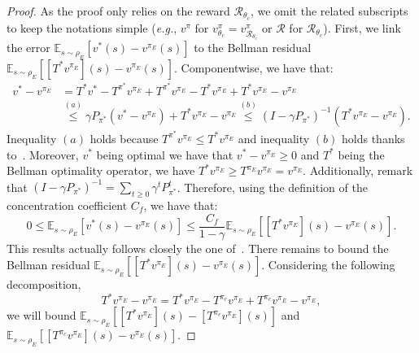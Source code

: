 \documentclass[english,utf8]{./hermes-journal}
\newcommand{\R}{\mathcal{R}}
\newcommand{\E}{\mathbb{E}}
\begin{document}
\begin{proof}
  As the proof only relies on the reward $\R_{\theta_c}$, we
  omit the related subscripts to keep the notations simple
  (\textit{e.g.}, $v^\pi$ for
  $v^\pi_{\theta_c}=v^\pi_{\R_{\theta_c}}$ or $\R$ for $\R_{\theta_c}$). First, we link
  the error $\E_{s\sim\rho_E}[v^*(s)-v^{\pi_E}(s)]$ to the
  Bellman residual $\E_{s\sim\rho_E}[[T^*v^{\pi_E}](s)-v^{\pi_E}(s)]$.
  Componentwise, we have that:
  \begin{align}
    v^* - v^{\pi_E} &= T^* v^*  - T^{\pi^*}v^{\pi_E} +
    T^{\pi^*}v^{\pi_E} - T^* v^{\pi_E} + T^* v^{\pi_E} - v^{\pi_E}
    \\
    &\stackrel{(a)}{\leq} \gamma P_{\pi^*}(v^*-v^{\pi_E}) + T^*
    v^{\pi_E} - v^{\pi_E}
    \stackrel{(b)}{\leq} (I-\gamma
    P_{\pi^*})^{-1} (T^* v^{\pi_E} - v^{\pi_E}).
  \end{align}
  Inequality $(a)$ holds because $T^{\pi^*} v^{\pi_E}\leq T^*
  v^{\pi_E}$ and inequality $(b)$ holds thanks
  to~\cite[Lemma~4.2]{Munos:2007}. Moreover, $v^*$ being optimal we
  have that $v^*-v^{\pi_E}\geq 0$ and $T^*$ being the Bellman
  optimality operator, we have $T^* v^{\pi_E}\geq
  T^{\pi_E}v^{\pi_E}=v^{\pi_E}$. Additionally, remark that
  $(I-\gamma P_{\pi^*})^{-1} = \sum_{t\geq 0}\gamma^t P_{\pi^*}^t$.
  Therefore, using the definition of the concentration coefficient
  $C_f$, we have that:
  \begin{equation}
    0\leq\E_{s\sim\rho_E}[v^*(s)-v^{\pi_E}(s)] \leq \frac{C_f}{1-\gamma}
    \E_{s\sim\rho_E}\left[[T^*v^{\pi_E}](s) - v^{\pi_E}(s)\right].
    \label{eq:proof:residual}
  \end{equation}
  This results actually follows closely the one
  of~\cite[Theorem~4.2]{Munos:2007}. There remains to bound the
  Bellman residual $\E_{s\sim\rho_E}[[T^*v^{\pi_E}](s) -
  v^{\pi_E}(s)]$. Considering the following decomposition,
  \begin{equation}
    T^* v^{\pi_E} - v^{\pi_E} = T^* v^{\pi_E} - T^{\pi_c}v^{\pi_E}
    + T^{\pi_c}v^{\pi_E}- v^{\pi_E},
    \label{eq:proof:decomposition}
  \end{equation}
  we will bound $\E_{s\sim\rho_E}[[T^* v^{\pi_E}](s) - [T^{\pi_c}v^{\pi_E}](s)]$
  and $\E_{s\sim\rho_E}[[T^{\pi_c}v^{\pi_E}](s) - v^{\pi_E}(s)]$.


\end{proof}
\end{document}
